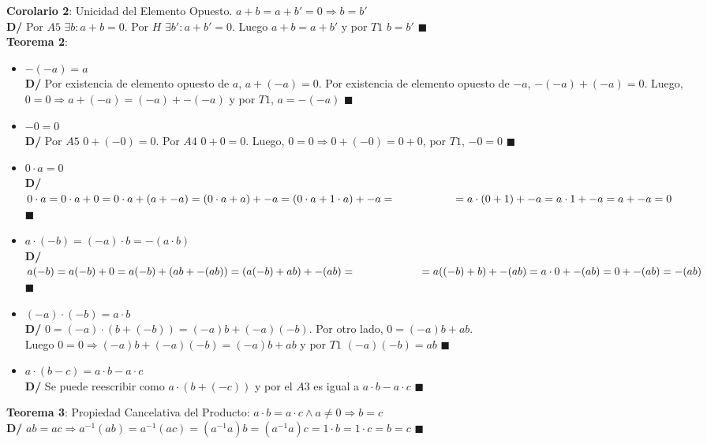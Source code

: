 \documentclass[11pt,a4paper]{article}
\newcommand*{\QEDA}{\null\nobreak\hfill\ensuremath{\blacksquare}}
\begin{document}
\noindent \textbf{Corolario 2}: Unicidad del Elemento Opuesto. $a+b = a+b' = 0 \Rightarrow b=b'$\\
\textbf{D/} Por $A5$ $\exists b : a+b=0$. Por $H$ $\exists b' : a + b' = 0$. Luego $a+b = a + b'$ y por $T1$ $b = b'$ \QEDA\\

\noindent \textbf{Teorema 2}:
\begin{itemize}
\item $-(-a)=a$\\
\textbf{D/} Por existencia de elemento opuesto de $a$, $a + (-a) = 0$. Por existencia de elemento opuesto de $-a$, $-(-a) + (-a) = 0$. Luego, $0 = 0 \Rightarrow a + (-a) = (-a) + -(-a)$ y por $T1$, $a = -(-a)$ \QEDA
\item $-0 = 0$\\
\textbf{D/} Por $A5$ $0 + (-0) = 0$. Por $A4$ $0 + 0 = 0$. Luego, $0 = 0 \Rightarrow 0 + (-0) = 0 + 0$, por $T1$, $-0 = 0$ \QEDA
\item $0 \cdot a = 0$\\
\textbf{D/} $0 \cdot a = 0 \cdot a + 0 = 0 \cdot a + (a + -a) = (0 \cdot a + a) + -a = (0 \cdot a + 1 \cdot a) + -a = \\ \indent \ \ \ \ \ \ \ \ \ \ \ = a \cdot (0 + 1) + -a = a \cdot 1 + -a = a + -a = 0$ \QEDA
\item $a \cdot (-b) = (-a) \cdot b = -(a \cdot b)$\\
\textbf{D/} $a (-b) = a (-b) + 0 = a (-b) + (ab + -(ab)) = (a (-b) + ab) + -(ab) = \\ \indent \ \ \ \ \ \ \ \ \ \ \ \ \ = a((-b) + b) + -(ab) = a\cdot 0 + -(ab) = 0 + -(ab) = -(ab)$ \QEDA
\item $(-a) \cdot (-b) = a \cdot b$\\
\textbf{D/} $0 = (-a) \cdot (b + (-b)) = (-a) b + (-a)(-b)$. Por otro lado, $0 = (-a)b + ab$.\\ Luego $0 = 0 \Rightarrow (-a) b + (-a)(-b) = (-a)b + ab$ y por $T1$ $(-a)(-b) = ab$ \QEDA
\item $a \cdot (b-c) = a \cdot b - a \cdot c$\\
\textbf{D/} Se puede reescribir como $a \cdot (b + (-c))$ y por el $A3$ es igual a $a \cdot b - a \cdot c$ \QEDA
\end{itemize}

\noindent \textbf{Teorema 3}: Propiedad Cancelativa del Producto: $a \cdot b = a \cdot c \land a \not = 0 \Rightarrow b = c$\\
\textbf{D/} $ab = ac \Rightarrow a^{-1}(ab) = a^{-1}(ac) = (a^{-1}a)b = (a^{-1}a)c = 1\cdot b = 1\cdot c = b=c$ \QEDA\\
\end{document}
